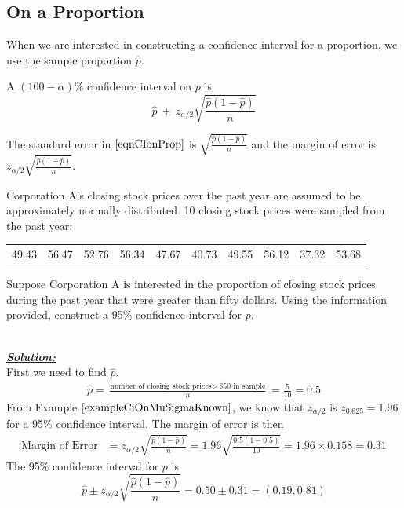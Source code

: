 \begin{example}
\end{example}








\subsection{On a Proportion}

When we are interested in constructing a confidence interval for a proportion,
we use the sample proportion $\hat{p}$.

\begin{ci}
A $(100 - \alpha)\%$ confidence interval on $p$ is
\begin{equation}\label{eqnCIonProp}
\hat{p}	~\pm~	z_{\alpha / 2}  \sqrt{ \frac{ \hat{p} (1-\hat{p}) }{n} }
\end{equation}
\end{ci}
\noindent
The standard error in $\ref{eqnCIonProp}$ is
$\sqrt{ \frac{ \hat{p} (1-\hat{p}) }{n} }$
and the margin of error is 
$z_{\alpha / 2}  \sqrt{ \frac{ \hat{p} (1-\hat{p}) }{n} }$.



\begin{example}
\label{exampleCiOnP}
Corporation A's closing stock prices over the past year are assumed to be approximately normally distributed. 10 closing stock prices were sampled from the past year:
\begin{center}
\begin{tabular}{cccccccccc}
49.43 & 56.47 & 52.76 & 56.34 & 47.67 & 40.73 & 49.55 & 56.12 & 37.32 & 53.68
\end{tabular}
\end{center}

Suppose Corporation A is interested in the proportion of closing stock prices during the past year that were greater than fifty dollars. Using the information provided, construct a 95\% confidence interval for $p$. 


\hfill\\
{\emph{\textbf{\underline{Solution:}}}}\\


First we need to find $\hat{p}$. 
\begin{align*}
\hat{p} = \frac{\text{number of closing stock prices}>~\text{\$50 in sample}}{n} = \frac{5}{10} = 0.5
\end{align*}
From Example $\ref{exampleCiOnMuSigmaKnown}$, we know that $z_{\alpha/2}$ is $z_{0.025}=1.96$ for a 95\% confidence interval. The margin of error is then
\begin{align*}
\text{Margin of Error} &= z_{\alpha/2} \sqrt{\frac{\hat{p}(1-\hat{p})}{n}}
									= 1.96 \sqrt{\frac{0.5 (1-0.5)}{10}}
									= 1.96 \times 0.158
									= 0.31
\end{align*}
The 95\% confidence interval for $p$ is
\[ \hat{p} \pm z_{\alpha/2} \sqrt{\frac{\hat{p}(1-\hat{p})}{n}} = 0.50 \pm 0.31 = (0.19, 0.81) \]

\end{example}




